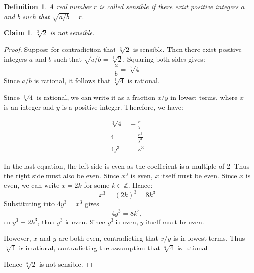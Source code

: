 \documentclass{article}
\newtheorem*{definition}{Definition}
\newtheorem*{claim}{Claim}
\begin{document}
\begin{definition}
    A real number $r$ is called sensible if there exist positive integers $a$ and $b$
    such that $\sqrt{a/b} = r$.
\end{definition}

\begin{claim}
    $\sqrt[3]{2}$ is not sensible.
\end{claim}

\begin{proof}
    Suppose for contradiction that $\sqrt[3]{2}$ is sensible. Then there exist positive 
    integers $a$ and $b$ such that $\sqrt{a/b} = \sqrt[3]{2}$. Squaring both sides gives:
    \[
    \frac{a}{b} = \sqrt[3]{4}
    \]
    Since $a/b$ is rational, it follows that $\sqrt[3]{4}$ is rational.

    \medskip

    Since $\sqrt[3]{4}$ is rational, we can write it as a fraction $x/y$ in lowest terms,
    where $x$ is an integer and $y$ is a positive integer. Therefore, we have:

    \[
    \begin{aligned}
    \sqrt[3]{4} &= \frac{x}{y} \\
    4 &= \frac{x^3}{y^3} \\
    4y^3 &= x^3
    \end{aligned}
    \]

    In the last equation, the left side is even as the coefficient is a multiple of 2.
    Thus the right side must also be even. Since $x^3$ is even, $x$ itself must be even.
    Since $x$ is even, we can write $x = 2k$ for some $k \in \mathbb{Z}$. Hence:
    \[
    x^3 = (2k)^3 = 8k^3
    \]
    Substituting into $4y^3 = x^3$ gives
    \[
    4y^3 = 8k^3,
    \]
    so $y^3 = 2k^3$, thus $y^3$ is even. Since $y^3$ is even, $y$ itself must be even.

    \medskip

    However, $x$ and $y$ are both even, contradicting that $x/y$ is in lowest terms.
    Thus $\sqrt[3]{4}$ is irrational, contradicting the assumption that $\sqrt[3]{4}$ 
    is rational.

    \medskip

    Hence $\sqrt[3]{2}$ is not sensible.
\end{proof}
\end{document}
